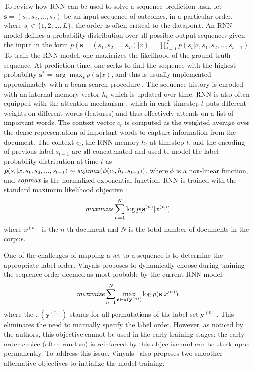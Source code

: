 To review how RNN can be used to solve a sequence prediction task, let $\mathbf{s}=(s_1,s_2,...,s_T)$ be an input sequence of outcomes, in a particular order, where $s_t \in \{1,2,...,L\}$; the order is often critical to the datapoint. An RNN model defines a probability distribution over all possible output sequences given the input in the form $p(\mathbf{s}=(s_1,s_2,...,s_T)|x)=\prod_{t=1}^T p(s_t|x,s_1,s_2,...,s_{t-1})$. To train the RNN model, one maximizes the likelihood of the ground truth sequence. %
At prediction time, one seeks to find the sequence with the highest probability $\mathbf{s}^*=\arg\max_\mathbf{s} p(\mathbf{s}|x)$, and this is usually implemented approximately with a beam search procedure \cite{lowerre1976harpy}. The sequence history is encoded with an internal memory vector $h_t$ which is updated over time. RNN is also often equipped with the attention mechanism \cite{DBLP:journals/corr/BahdanauCB14}, which in each timestep $t$ puts different weights on different words (features) and thus effectively attends on a list of important words. The context vector $c_t$ is computed as the weighted average over the dense representation of important words to capture information from the document. The context $c_t$, the RNN memory $h_t$ at timestep $t$, and the encoding of previous label ${s_{t-1}}$ are all concatenated and used to model the label probability distribution at time $t$ as $p(s_t|x,s_1,s_2,...,s_{t-1}) \sim \textit{softmax}(\phi(c_t,h_t,s_{t-1}))$, where $\phi$ is a non-linear function, and $\textit{softmax}$ is the normalized exponential function. RNN is trained with the standard maximum likelihood objective \cite{DBLP:conf/nips/NamMKF17}: 
\begin{align}
\textit{maximize} \sum_{n=1}^N \log p(\mathbf{s}^{(n)}|x^{(n)})
\label{eq:standard_rnn}
\end{align}
where $x^{(n)}$ is the $n$-th document and $N$ is the total number of documents in the corpus. 

One of the challenges of mapping a set to a sequence is to determine the appropriate label order. Vinyals \cite{vinyals2015order} proposes to dynamically choose during training the sequence order deemed as most probable by the current RNN model:
\begin{align}
\textit{maximize} \sum_{n=1}^N \max_{\mathbf{s}\in \pi(\mathbf{y}^{(n)})}\log p(\mathbf{s}|x^{(n)})
\label{eq:max_obj}
\end{align}
where the $\pi(\mathbf{y}^{(n)})$ stands for all permutations of the label set $\mathbf{y}^{(n)}$. This eliminates the need to manually specify the label order.
However, as noticed by the authors, this objective cannot be used in the early training stages: the early order choice (often random) is reinforced by this objective and can be stuck upon permanently. To address this issue, Vinyals \cite{vinyals2015order}~also proposes two smoother alternative objectives to initialize the model training:

